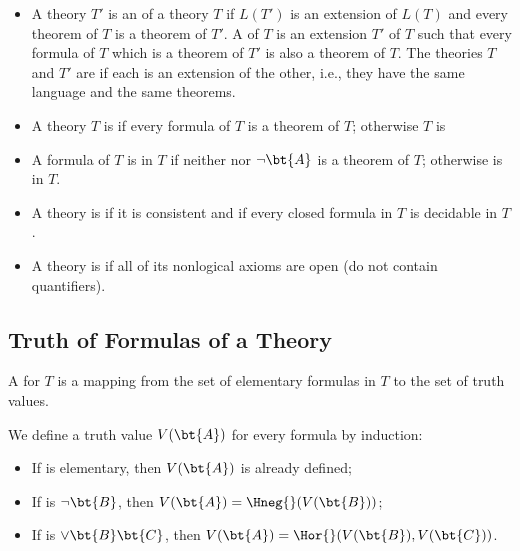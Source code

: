 \begin{itemize}
	\item A theory $T'$ is an  of a theory $T$ if $L(T')$ is an extension of $L(T)$ 
	and every theorem of $T$ is a theorem of $T'$. A 
	 of $T$ is an extension $T'$ of $T$ 
	such that every formula of $T$ which is a theorem of $T'$ is 
	also a theorem of $T$. The theories	$T$ and $T'$ are 
	 if each is an 
	extension of the other, i.e., they have the same language and 
	the same theorems.
	
	\item A theory $T$ is 
	 if every formula of 
	$T$ is a theorem of $T$; otherwise $T$ is 
	
	\item A formula  of $T$ is 
	 in $T$ if neither 
	 nor $\neg {}$ is a theorem of $T$; otherwise \bt{A} 
	is  in $T$.
	
	\item A theory is  if it is 
	consistent and if every closed formula in $T$ is decidable in 
	$T$.
	
	\item A theory is  if all of 
	its nonlogical axioms are open (do not contain quantifiers).
\end{itemize}


\subsection{Truth of Formulas of a Theory}

\begin{definition}
	A 	for $T$ is a mapping from the set of elementary 
	formulas in $T$ to the set of truth values.
\end{definition}

We define a truth value $V(\bt{A})$ for every formula  by 
induction:
\begin{itemize}
	\item If  is elementary, then $V(\bt{A})$ is already 
	defined;
	
	\item If  is $\neg \bt{B}$, then $V(\bt{A}) = 
	\Hneg{}(V(\bt{B}))$;
	
	\item If  is $\lor \bt{B} \bt{C}$, then $V(\bt{A}) = 
	\Hor{}(V(\bt{B}),V(\bt{C}))$.
\end{itemize}

